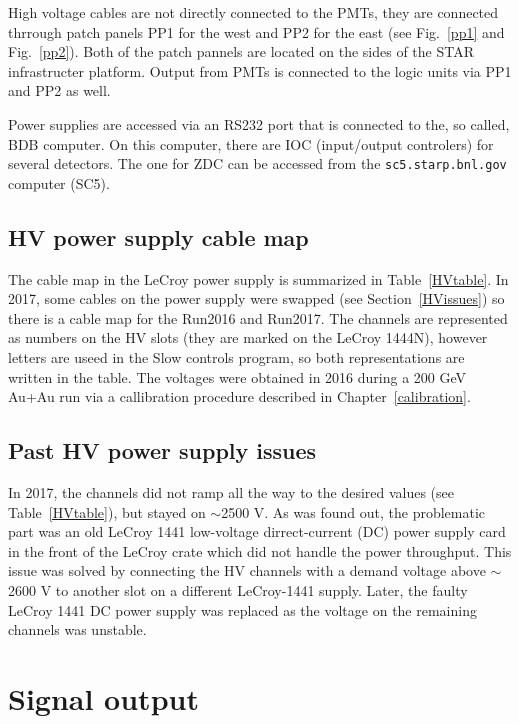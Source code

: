 High voltage cables are not directly connected to the PMTs, they are connected thrrough patch panels PP1 for the west and PP2 for the east (see Fig.~\ref{pp1} and Fig.~\ref{pp2}). Both of the patch pannels are located on the sides of the STAR infrastructer platform. Output from PMTs is connected to the logic units via PP1 and PP2 as well.

Power supplies are accessed via an RS232 port that is connected to the, so called, BDB computer. On this computer, there are IOC (input/output controlers) for several detectors. The one for ZDC can be accessed from the \texttt{sc5.starp.bnl.gov} computer (SC5).

\subsection{HV power supply cable map}

 

The cable map in the LeCroy power supply is summarized in Table~\ref{HVtable}. In 2017, some cables on the power supply were swapped (see Section~\ref{HVissues}) so there is a cable map for the Run2016 and Run2017. The channels are represented as numbers on the HV slots (they are marked on the LeCroy 1444N), however letters are useed in the Slow controls program, so both representations are written in the table. The voltages were obtained in 2016 during a 200 GeV Au+Au run via a callibration procedure described in Chapter~\ref{calibration}.

\subsection{Past HV power supply issues\label{HVissues}}
In 2017, the channels did not ramp all the way to the desired values (see Table~\ref{HVtable}), but stayed on $\sim$2500 V\@. As was found out, the problematic part was an old LeCroy 1441 low-voltage dirrect-current (DC) power supply card in the front of the LeCroy crate which did not handle the power throughput. This issue was solved by connecting the HV channels with a demand voltage above $\sim$2600 V to another slot on a different LeCroy-1441 supply. Later, the faulty LeCroy 1441 DC power supply was replaced as the voltage on the remaining channels was unstable.

\section{Signal output}

